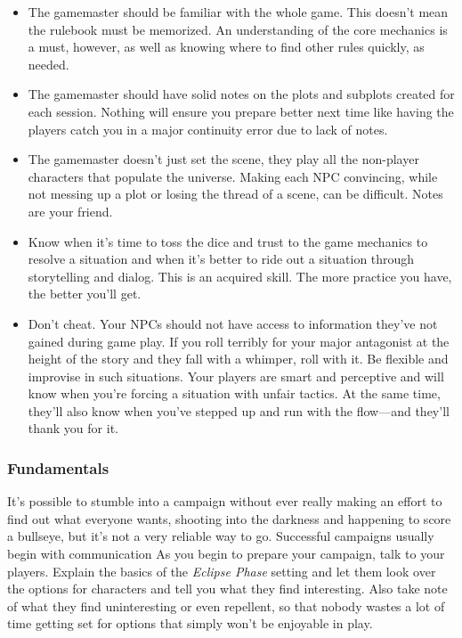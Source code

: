 \begin{itemize}
\item  The gamemaster should be familiar with the whole game. This doesn't mean the rulebook must be memorized. An understanding of the core mechanics is a must, however, as well as knowing where to find other rules quickly, as needed. 
\item  The gamemaster should have solid notes on the plots and subplots created for each session. Nothing will ensure you prepare better next time like having the players catch you in a major continuity error due to lack of notes.
\item  The gamemaster doesn't just set the scene, they play all the non-player characters that populate the universe. Making each NPC convincing, while not messing up a plot or losing the thread of a scene, can be difficult. Notes are your friend. 
\item  Know when it's time to toss the dice and trust to the game mechanics to resolve a situation and when it's better to ride out a situation through storytelling and dialog. This is an acquired skill.  The more practice you have, the better you'll get. 
\item  Don't cheat. Your NPCs should not have access to information they've not gained during game play. If you roll terribly for your major antagonist at the height of the story and they fall with a whimper, roll with it. Be flexible and improvise in such situations. Your players are smart and perceptive and will know when you're forcing a situation with unfair tactics. At the same time, they'll also know when you've stepped up and run with the flow—and they'll thank you for it.  
\end{itemize}

\subsubsection{Fundamentals}

It's possible to stumble into a campaign without ever 
really making an effort to find out what everyone 
wants, shooting into the darkness and happening to 
score a bullseye, but it's not a very reliable way to go. 
Successful campaigns usually begin with communication
As you begin to prepare your campaign, talk to
your players. Explain the basics of the \textit{Eclipse Phase}
setting and let them look over the options for characters
and tell you what they find interesting. Also take
note of what they find uninteresting or even repellent, 
so that nobody wastes a lot of time getting set for options
that simply won't be enjoyable in play.

